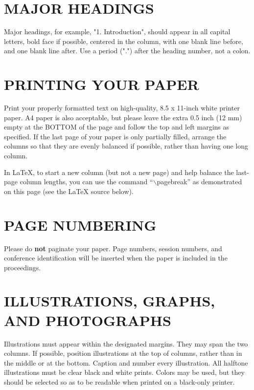 \documentclass[letterpaper, 11 pt, twoside, conference]{ieeeconf}
\begin{document}
\section{MAJOR HEADINGS}
\label{sec:majhead}

Major headings, for example, "1. Introduction", should appear in all capital
letters, bold face if possible, centered in the column, with one blank line
before, and one blank line after. Use a period (".") after the heading number,
not a colon.

\section{PRINTING YOUR PAPER}
\label{sec:print}

Print your properly formatted text on high-quality, 8.5 x 11-inch white printer
paper. A4 paper is also acceptable, but please leave the extra 0.5 inch (12 mm)
empty at the BOTTOM of the page and follow the top and left margins as
specified.  If the last page of your paper is only partially filled, arrange
the columns so that they are evenly balanced if possible, rather than having
one long column.

In LaTeX, to start a new column (but not a new page) and help balance the
last-page column lengths, you can use the command ``$\backslash$pagebreak'' as
demonstrated on this page (see the LaTeX source below).

\section{PAGE NUMBERING}
\label{sec:page}

Please do {\bf not} paginate your paper.  Page numbers, session numbers, and
conference identification will be inserted when the paper is included in the
proceedings.

\section{ILLUSTRATIONS, GRAPHS, AND PHOTOGRAPHS}
\label{sec:illust}

Illustrations must appear within the designated margins.  They may span the two
columns.  If possible, position illustrations at the top of columns, rather
than in the middle or at the bottom.  Caption and number every illustration.
All halftone illustrations must be clear black and white prints.  Colors may be
used, but they should be selected so as to be readable when printed on a
black-only printer.
\end{document}
